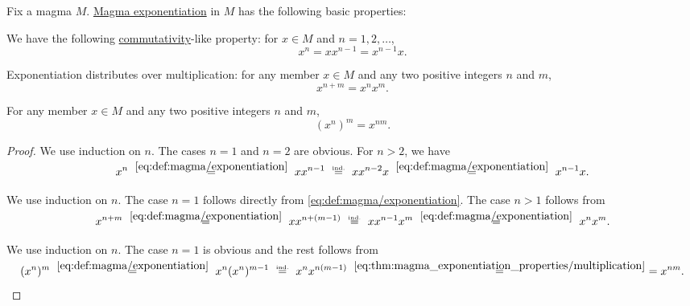 \begin{proposition}\label{thm:magma_exponentiation_properties}
  Fix a magma \( M \). \hyperref[def:magma/exponentiation]{Magma exponentiation} in \( M \) has the following basic properties:

  \begin{thmenum}
     We have the following \hyperref[def:magma/commutative]{commutativity}-like property: for \( x \in M \) and \( n = 1, 2, \ldots \),
    \begin{equation}\label{eq:thm:magma_exponentiation_properties/commutativity}
      x^n = x x^{n-1} = x^{n-1} x.
    \end{equation}

     Exponentiation distributes over multiplication: for any member \( x \in M \) and any two positive integers \( n \) and \( m \),
    \begin{equation}\label{eq:thm:magma_exponentiation_properties/multiplication}
      x^{n + m} = x^n x^m.
    \end{equation}

     For any member \( x \in M \) and any two positive integers \( n \) and \( m \),
    \begin{equation}\label{eq:thm:magma_exponentiation_properties/repeated}
      (x^n)^m = x^{nm}.
    \end{equation}
  \end{thmenum}
\end{proposition}
\begin{proof}
   We use induction on \( n \). The cases \( n = 1 \) and \( n = 2 \) are obvious. For \( n > 2 \), we have
  \begin{equation*}
    x^n
    \reloset {\eqref{eq:def:magma/exponentiation}} =
    x x^{n-1}
    \reloset {\T{ind.}} =
    x x^{n-2} x
    \reloset {\eqref{eq:def:magma/exponentiation}} =
    x^{n-1} x.
  \end{equation*}

   We use induction on \( n \). The case \( n = 1 \) follows directly from \eqref{eq:def:magma/exponentiation}. The case \( n > 1 \) follows from
  \begin{equation*}
    x^{n + m}
    \reloset {\eqref{eq:def:magma/exponentiation}} =
    x x^{n + (m - 1)}
    \reloset {\T{ind.}} =
    x x^{n-1} x^m
    \reloset {\eqref{eq:def:magma/exponentiation}} =
    x^n x^m.
  \end{equation*}

   We use induction on \( n \). The case \( n = 1 \) is obvious and the rest follows from
  \begin{equation*}
    (x^n)^m
    \reloset {\eqref{eq:def:magma/exponentiation}} =
    x^n (x^n)^{m-1}
    \reloset {\T{ind.}} =
    x^n x^{n (m - 1)}
    \reloset {\eqref{eq:thm:magma_exponentiation_properties/multiplication}} =
    =
    x^{nm}.
  \end{equation*}
\end{proof}


